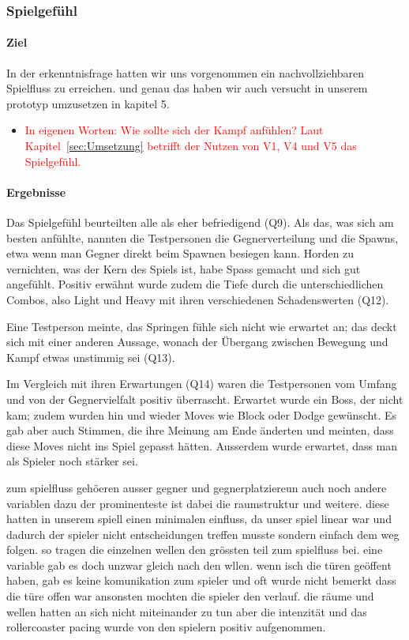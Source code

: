 \documentclass[../Main.tex]{subfiles}
\begin{document}
\subsubsection{Spielgefühl}

\paragraph{Ziel}

In der erkenntnisfrage hatten wir uns vorgenommen ein nachvollziehbaren Spielfluss zu erreichen. und genau das haben wir auch versucht in unserem prototyp umzusetzen in kapitel 5.

\begin{itemize}[leftmargin=1.5cm]
    \item \textcolor{red}{In eigenen Worten: Wie sollte sich der Kampf anfühlen? Laut Kapitel~\ref{sec:Umsetzung} betrifft der Nutzen von V1, V4 und V5 das Spielgefühl.}
\end{itemize}

\paragraph{Ergebnisse}
Das Spielgefühl beurteilten alle als eher befriedigend (Q9). Als das, was sich am besten anfühlte, nannten die Testpersonen die Gegnerverteilung und die Spawns, etwa wenn man Gegner direkt beim Spawnen besiegen kann. Horden zu vernichten, was der Kern des Spiels ist, habe Spass gemacht und sich gut angefühlt. Positiv erwähnt wurde zudem die Tiefe durch die unterschiedlichen Combos, also Light und Heavy mit ihren verschiedenen Schadenswerten (Q12).

Eine Testperson meinte, das Springen fühle sich nicht wie erwartet an; das deckt sich mit einer anderen Aussage, wonach der Übergang zwischen Bewegung und Kampf etwas unstimmig sei (Q13).

Im Vergleich mit ihren Erwartungen (Q14) waren die Testpersonen vom Umfang und von der Gegnervielfalt positiv überrascht. Erwartet wurde ein Boss, der nicht kam; zudem wurden hin und wieder Moves wie Block oder Dodge gewünscht. Es gab aber auch Stimmen, die ihre Meinung am Ende änderten und meinten, dass diese Moves nicht ins Spiel gepasst hätten. Ausserdem wurde erwartet, dass man als Spieler noch stärker sei.

zum spielfluss gehöeren ausser gegner und gegnerplatziereun auch noch andere variablen dazu der prominenteste ist dabei die raumstruktur und weitere. diese hatten in unserem spiell einen minimalen einfluss, da unser spiel linear war und dadurch der spieler nicht entscheidungen treffen musste sondern einfach dem weg folgen. so tragen die einzelnen wellen den grössten teil zum spielfluss bei. eine variable gab es doch unzwar gleich nach den wllen. wenn isch die türen geöffent haben, gab es keine komunikation zum spieler und oft wurde nicht bemerkt dass die türe offen war ansonsten mochten die spieler  den verlauf. die räume und wellen hatten an sich nicht miteinander zu tun aber die intenzität und das rollercoaster pacing wurde von den spielern positiv aufgenommen.
\end{document}
